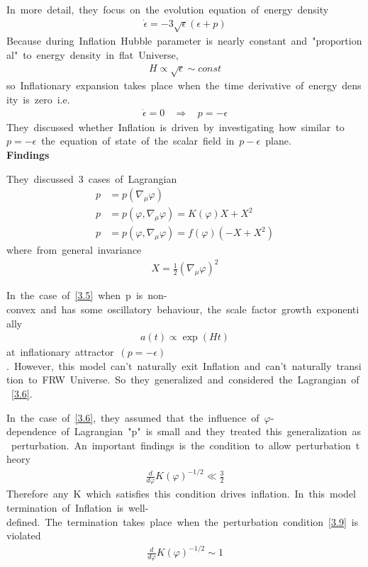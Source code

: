 In\ more\ detail,\ they\ focus\ on\ the\ evolution\ equation\ of\ energy\ density
\begin{align}
    \Dot{\epsilon}=-3\sqrt{\epsilon}(\epsilon+p)
\end{align}
Because\ during\ Inflation\ Hubble\ parameter\ is\ nearly\ constant\ and\ "proportional"\ to\ energy\ density\ in\ flat\ Universe,
\begin{align}
    H\propto\sqrt{\epsilon}\sim const
\end{align}
so\ Inflationary\ expansion\ takes\ place\ when\ the\ time\ derivative\ of\ energy\ density\ is\ zero\ i.e.
\begin{align}
    \Dot{\epsilon}=0\ \ \ \ \Rightarrow\ \ \ \ p=-\epsilon
\end{align}
They\ discussed\ whether\ Inflation\ is\ driven\ by\ investigating\ how\ similar\ to\ $p=-\epsilon$\ the\ equation\ of\ state\ of\ the\ scalar\ field\ in\ $p-\epsilon$\ plane.\\
\textbf{Findings}

They\ discussed\ 3\ cases\ of\ Lagrangian
\begin{align}
    p&=p(\nabla_{\mu}\varphi)\label{3.5}\\
    p&=p(\varphi,\nabla_{\mu}\varphi)=K(\varphi)X+X^2\label{3.6}\\
    p&=p(\varphi,\nabla_{\mu}\varphi)=f(\varphi)(-X+X^2)\label{3.7}
\end{align}
where\ from\ general\ invariance
\begin{align*}
    X=\frac{1}{2}(\nabla_{\mu}\varphi)^2
\end{align*}

In\ the\ case\ of\ \eqref{3.5}\ when\ p\ is\ non-convex\ and\ has\ some\ oscillatory\ behaviour,\ the\ scale\ factor\ growth\ exponentially
\begin{align}
    a(t)\propto\exp(Ht)
\end{align}
at\ inflationary\ attractor\ $(p=-\epsilon)$.\ However,\ this\ model\ can't\ naturally\ exit\ Inflation\ and\ can't\ naturally\ transition\ to\ FRW\ Universe.\ So\ they\ generalized\ and\ considered\ the\ Lagrangian\ of\ \eqref{3.6}.

In\ the\ case\ of\ \eqref{3.6},\ they\ assumed\ that\ the\ influence\ of\ $\varphi$-dependence\ of\ Lagrangian\ "p"\ is\ small\ and\ they\ treated\ this\ generalization\ as\ perturbation.\ An\ important\ findings\ is\ the\ condition\ to\ allow\ perturbation\ theory
\begin{align}\label{3.9}
    \frac{d}{d\varphi}K(\varphi)^{-1/2}\ll\frac{3}{2}
\end{align}
Therefore\ any\ K\ which\ satisfies\ this\ condition\ drives\ inflation.\ In\ this\ model\ termination\ of\ Inflation\ is\ well-defined.\ The\ termination\ takes\ place\ when\ the\ perturbation\ condition\ \eqref{3.9}\ is\ violated
\begin{align}
    \frac{d}{d\varphi}K(\varphi)^{-1/2}\sim1
\end{align}

